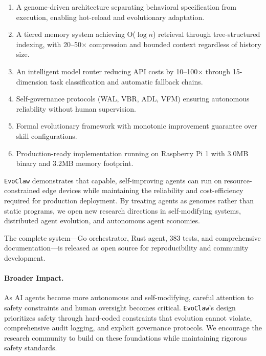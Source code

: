 \documentclass{article}
\newcommand{\evoclaw}{\texttt{EvoClaw}\xspace}
\begin{document}
\begin{enumerate}[leftmargin=*]
    \item A genome-driven architecture separating behavioral specification from execution, enabling hot-reload and evolutionary adaptation.
    
    \item A tiered memory system achieving O($\log n$) retrieval through tree-structured indexing, with 20--50$\times$ compression and bounded context regardless of history size.
    
    \item An intelligent model router reducing API costs by 10--100$\times$ through 15-dimension task classification and automatic fallback chains.
    
    \item Self-governance protocols (WAL, VBR, ADL, VFM) ensuring autonomous reliability without human supervision.
    
    \item Formal evolutionary framework with monotonic improvement guarantee over skill configurations.
    
    \item Production-ready implementation running on Raspberry Pi 1 with 3.0MB binary and 3.2MB memory footprint.
\end{enumerate}

\evoclaw{} demonstrates that capable, self-improving agents can run on resource-constrained edge devices while maintaining the reliability and cost-efficiency required for production deployment. By treating agents as genomes rather than static programs, we open new research directions in self-modifying systems, distributed agent evolution, and autonomous agent economies.

The complete system—Go orchestrator, Rust agent, 383 tests, and comprehensive documentation—is released as open source for reproducibility and community development.

\paragraph{Broader Impact.} As AI agents become more autonomous and self-modifying, careful attention to safety constraints and human oversight becomes critical. \evoclaw{}'s design prioritizes safety through hard-coded constraints that evolution cannot violate, comprehensive audit logging, and explicit governance protocols. We encourage the research community to build on these foundations while maintaining rigorous safety standards.
\end{document}
